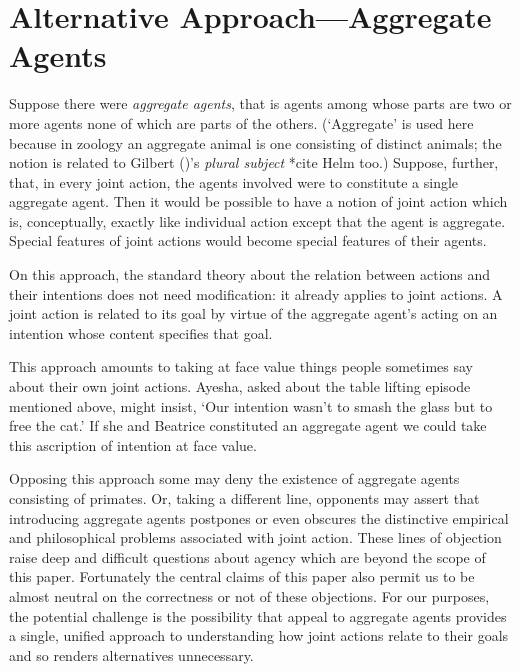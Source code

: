 \documentclass[12pt,a4paper]{extarticle}
\begin{document}
 

\section{Alternative Approach---Aggregate Agents}

Suppose there were \emph{aggregate agents}, that is agents among whose parts are two or more agents 
none of which are parts of the others. 
(`Aggregate' is used here  because in zoology an aggregate animal is one consisting of distinct animals; the notion is related to Gilbert (\citeyear{Gilbert:1992rs})'s \emph{plural subject} *cite Helm too.)  
Suppose, further, that, in every joint action, the agents involved were to constitute a single aggregate agent.  
Then it would be possible to have a notion of joint action which is, conceptually, exactly like individual action except that the agent is aggregate.  Special features of joint actions would become special features of their agents.

On this approach, the standard theory about the relation between actions and their intentions does not need modification: it already applies to joint actions.  A joint action is related to its goal by virtue of the aggregate agent's acting on an intention whose content specifies that goal.  

This approach amounts to taking at face value things people sometimes say about their own joint actions.  Ayesha, asked about the table lifting episode mentioned above, might insist, `Our intention wasn't to smash the glass but to free the cat.'  If she and Beatrice constituted an aggregate agent we could take this ascription of intention at face value.

Opposing this approach some may deny the existence of aggregate agents consisting of primates.  Or, taking a different line, opponents may assert that introducing aggregate agents postpones or even obscures the distinctive empirical and philosophical problems associated with joint action.  These lines of objection raise deep and difficult questions about agency which are beyond the scope of this paper.  Fortunately the central claims of this paper also permit us to be almost neutral on the correctness or not of these objections.  For our purposes, the potential challenge is the possibility that appeal to aggregate agents provides a single, unified approach to understanding how joint actions relate to their goals and so renders alternatives unnecessary.  
\end{document}

